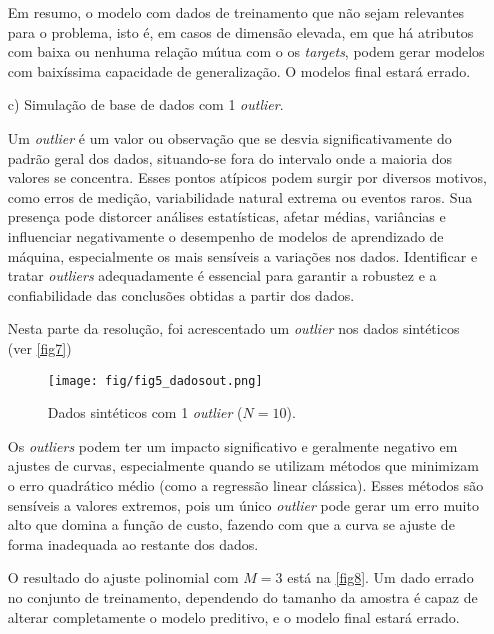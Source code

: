 \documentclass{article}
\begin{document}
\begin{itemize}
  	       Em resumo, o modelo com dados de treinamento que não sejam relevantes para o problema, isto é, em casos de dimensão elevada, em que há atributos com baixa ou nenhuma relação mútua com o os \textit{targets}, podem gerar modelos com baixíssima capacidade de generalização. O modelos final estará errado.  
  	
  	\item[c)] Simulação de base de dados com 1 \textit{outlier}.
  	       
  	       Um \textit{outlier} é um valor ou observação que se desvia significativamente do padrão geral dos dados, situando-se fora do intervalo onde a maioria dos valores se concentra. Esses pontos atípicos podem surgir por diversos motivos, como erros de medição, variabilidade natural extrema ou eventos raros. Sua presença pode distorcer análises estatísticas, afetar médias, variâncias e influenciar negativamente o desempenho de modelos de aprendizado de máquina, especialmente os mais sensíveis a variações nos dados. Identificar e tratar \textit{outliers} adequadamente é essencial para garantir a robustez e a confiabilidade das conclusões obtidas a partir dos dados.
  	       
  	       Nesta parte da resolução, foi acrescentado um \textit{outlier} nos dados sintéticos (ver \autoref{fig7})
  	       
  	       \begin{figure}[ht]
  	       	\centering %
  	       	\texttt{[image: fig/fig5\_dadosout.png]} %
  	       	\caption{Dados sintéticos com 1 \textit{outlier} ($N=10$).} %
  	       	\label{fig7} %
  	       \end{figure}
  	       
  	       Os \textit{outliers} podem ter um impacto significativo e geralmente negativo em ajustes de curvas, especialmente quando se utilizam métodos que minimizam o erro quadrático médio (como a regressão linear clássica). Esses métodos são sensíveis a valores extremos, pois um único \textit{outlier} pode gerar um erro muito alto que domina a função de custo, fazendo com que a curva se ajuste de forma inadequada ao restante dos dados. 
  	       
  	       O resultado do ajuste polinomial com $M=3$ está na \autoref{fig8}. Um dado errado no conjunto de treinamento, dependendo do tamanho da amostra é capaz de alterar completamente o modelo preditivo, e o  modelo final estará errado.
  	       

\end{itemize}
\end{document}
